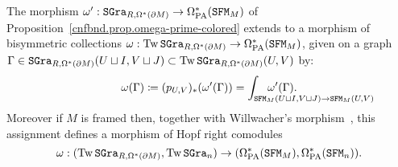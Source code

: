 \begin{proposition}
  The morphism $\omega' : \mathtt{SGra}_{R, \Omega^{*}(\partial M)} \to \Omega_{\mathrm{PA}}^{*}(\mathtt{SFM}_{M})$ of Proposition~\ref{cnfbnd.prop.omega-prime-colored} extends to a morphism of bisymmetric collections $\omega : \operatorname{Tw} \mathtt{SGra}_{R, \Omega^{*}(\partial M)} \to \Omega_{\mathrm{PA}}^{*}(\mathtt{SFM}_{M})$, given on a graph $\Gamma \in \mathtt{SGra}_{R, \Omega^{*}(\partial M)}(U \sqcup I, V \sqcup J) \subset \operatorname{Tw} \mathtt{SGra}_{R, \Omega^{*}(\partial M)}(U,V)$ by:
  \[ \omega(\Gamma) \coloneqq (p_{U,V})_{*}(\omega'(\Gamma)) = \int_{\mathrlap{\SFM_{M}(U \sqcup I, V \sqcup J) \to \SFM_{M}(U,V)}} \quad \omega'(\Gamma). \]
  Moreover if $M$ is framed then, together with Willwacher's morphism~\cite{Willwacher2015a}, this assignment defines a morphism of Hopf right comodules
  \[ \omega : (\operatorname{Tw} \mathtt{SGra}_{R, \Omega^{*}(\partial M)}, \operatorname{Tw} \mathtt{SGra}_{n}) \to (\Omega_{\mathrm{PA}}^{*}(\mathtt{SFM}_{M}), \Omega_{\mathrm{PA}}^{*}(\mathtt{SFM}_{n})). \]
\end{proposition}
